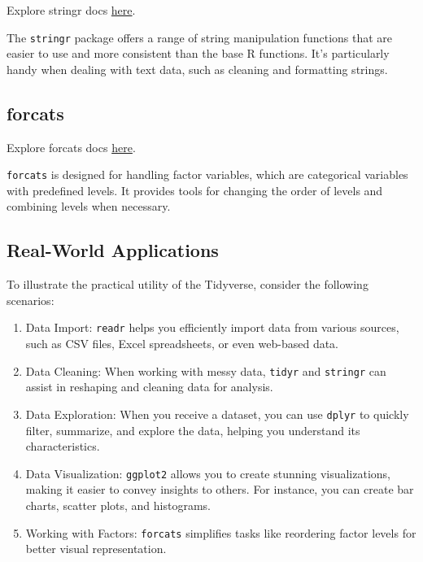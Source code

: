 \documentclass[
]{book}
\begin{document}
Explore stringr docs \href{https://stringr.tidyverse.org/index.html}{here}.

The \texttt{stringr} package offers a range of string manipulation functions that are easier to use and more consistent than the base R functions. It's particularly handy when dealing with text data, such as cleaning and formatting strings.

\hypertarget{forcats}{%
\subsection{forcats}\label{forcats}}

Explore forcats docs \href{https://forcats.tidyverse.org/index.html}{here}.

\texttt{forcats} is designed for handling factor variables, which are categorical variables with predefined levels. It provides tools for changing the order of levels and combining levels when necessary.

\hypertarget{real-world-applications-1}{%
\subsection{Real-World Applications}\label{real-world-applications-1}}

To illustrate the practical utility of the Tidyverse, consider the following scenarios:

\begin{enumerate}
\def\labelenumi{\arabic{enumi}.}
\item
  Data Import: \texttt{readr} helps you efficiently import data from various sources, such as CSV files, Excel spreadsheets, or even web-based data.
\item
  Data Cleaning: When working with messy data, \texttt{tidyr} and \texttt{stringr} can assist in reshaping and cleaning data for analysis.
\item
  Data Exploration: When you receive a dataset, you can use \texttt{dplyr} to quickly filter, summarize, and explore the data, helping you understand its characteristics.
\item
  Data Visualization: \texttt{ggplot2} allows you to create stunning visualizations, making it easier to convey insights to others. For instance, you can create bar charts, scatter plots, and histograms.
\item
  Working with Factors: \texttt{forcats} simplifies tasks like reordering factor levels for better visual representation.
\end{enumerate}
\end{document}
